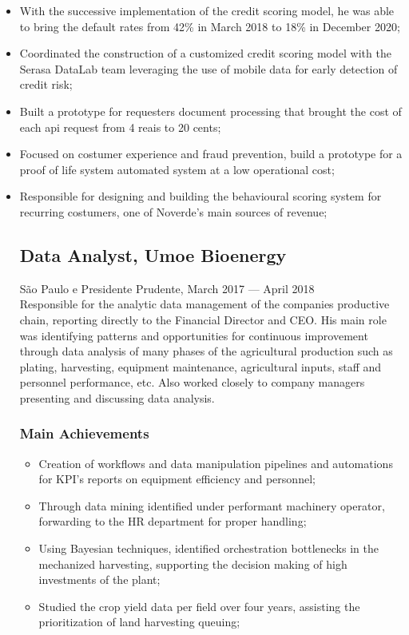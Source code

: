 \documentclass{article}
\newcommand{\jobdate}[3]{
\large
\vspace{0.05em} 
  {#1, #2 --- #3}
\vspace{0.5em} 
\\
}
\begin{document}
\begin{itemize}

\item{With the successive implementation of the credit scoring model, he was able to bring the default rates from 42\% in March 2018 to 18\% in December 2020;}
\item{Coordinated the construction of a customized credit scoring model with the Serasa DataLab team leveraging the use of mobile data for early detection of credit risk;}
\item{Built a prototype for requesters document processing that brought the cost of each api request from 4 reais to 20 cents;}
\item{Focused on costumer experience and fraud prevention, build a prototype for a proof of life system automated system at a low operational cost;}
\item{Responsible for designing and building the behavioural scoring system for recurring costumers, one of Noverde's main sources of revenue;}

\subsection{Data Analyst, Umoe Bioenergy}
\jobdate{São Paulo e Presidente Prudente}{March 2017}{April 2018}
Responsible for the analytic data management of the companies productive chain, reporting directly to the Financial Director and CEO. His main role was identifying patterns and opportunities for continuous improvement through data analysis of many phases of the agricultural production such as plating, harvesting, equipment maintenance, agricultural inputs, staff and personnel performance, etc. Also worked closely to company managers presenting and discussing data analysis.


\subsubsection{Main Achievements}

\begin{itemize}

\item{Creation of workflows and data manipulation pipelines and automations for KPI's reports on equipment efficiency and personnel;}
\item{Through data mining identified under performant machinery operator, forwarding to the HR department for proper handling;}
\item{Using Bayesian techniques, identified orchestration bottlenecks in the mechanized harvesting, supporting the decision making of high investments of the plant;}
\item{Studied the crop yield data per field over four years, assisting the prioritization of land harvesting queuing;}


\end{itemize}
\end{itemize}
\end{document}
